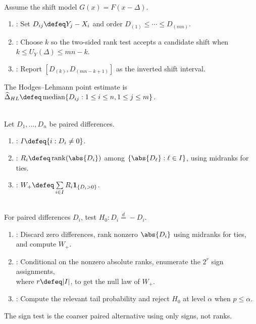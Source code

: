 \begin{method} \label{meth:mann-whitney-shift-interval} \\
Assume the shift model $G(x)=F(x-\Delta)$.
\begin{enumerate}[label=(\roman*)]
\setlength{\itemsep}{0pt}
\item {}: Set $D_{ij}\defeq Y_j-X_i$ and order $D_{(1)}\leq\cdots\leq D_{(mn)}$.
\item {}: Choose $k$ so the two-sided rank test accepts a candidate shift when $k\leq U_Y(\Delta)\leq mn-k$.
\item {}: Report $[D_{(k)},D_{(mn-k+1)}]$ as the inverted shift interval.
\end{enumerate}
The Hodges--Lehmann point estimate is $\widehat{\Delta}_{HL}\defeq\operatorname{median}\{D_{ij}:1\leq i\leq n,1\leq j\leq m\}$.
\end{method}

\begin{definition} \label{def:signed-rank-test-statistic} \\
Let $D_1,\ldots,D_n$ be paired differences.
\begin{enumerate}[label=(\roman*)]
\setlength{\itemsep}{0pt}
\item {}: $I\defeq\{i:D_i\neq0\}$.
\item {}: $R_i\defeq\operatorname{rank}(\abs{D_i})$ among $\{\abs{D_\ell}:\ell\in I\}$, using midranks for ties.
\item {}: $W_+\defeq\sum\limits_{i\in I}R_i\mathbf{1}_{\{D_i>0\}}$.
\end{enumerate}
\end{definition}

\begin{method} \label{meth:signed-rank-test} \\
For paired differences $D_i$, test $H_0:D_i\stackrel{d}{=}-D_i$.
\begin{enumerate}[label=(\roman*)]
\setlength{\itemsep}{0pt}
\item {}: Discard zero differences, rank nonzero $\abs{D_i}$ using midranks for ties, and compute $W_+$.
\item {}: Conditional on the nonzero absolute ranks, enumerate the $2^r$ sign assignments,\\
where $r\defeq|I|$, to get the null law of $W_+$.
\item {}: Compute the relevant tail probability and reject $H_0$ at level $\alpha$ when $p\leq\alpha$.
\end{enumerate}
The sign test is the coarser paired alternative using only signs, not ranks.
\end{method}

